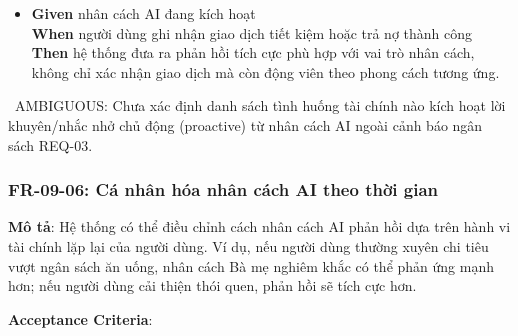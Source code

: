 \begin{itemize}
\item \textbf{Given} nhân cách AI đang kích hoạt  \\ \hspace*{1.5em}  \textbf{When} người dùng ghi nhận giao dịch tiết kiệm hoặc trả nợ thành công  \\ \hspace*{1.5em}  \textbf{Then} hệ thống đưa ra phản hồi tích cực phù hợp với vai trò nhân cách, không chỉ xác nhận giao dịch mà còn động viên theo phong cách tương ứng.
\end{itemize}
\warningicon\  AMBIGUOUS: Chưa xác định danh sách tình huống tài chính nào kích hoạt lời khuyên/nhắc nhở chủ động (proactive) từ nhân cách AI ngoài cảnh báo ngân sách REQ-03.



\subsubsection{FR-09-06: Cá nhân hóa nhân cách AI theo thời gian}

\textbf{Mô tả}: Hệ thống có thể điều chỉnh cách nhân cách AI phản hồi dựa trên hành vi tài chính lặp lại của người dùng. Ví dụ, nếu người dùng thường xuyên chi tiêu vượt ngân sách ăn uống, nhân cách Bà mẹ nghiêm khắc có thể phản ứng mạnh hơn; nếu người dùng cải thiện thói quen, phản hồi sẽ tích cực hơn.



\textbf{Acceptance Criteria}:

